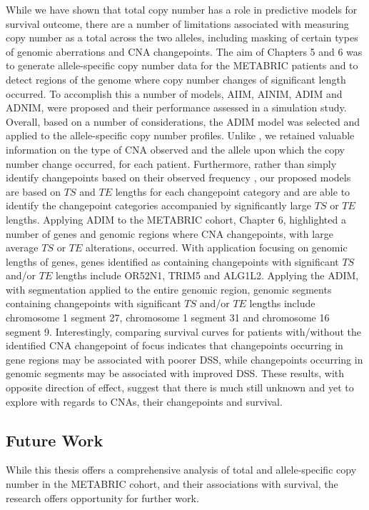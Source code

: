 While we have shown that total copy number has a role in predictive models for survival outcome, there are a number of limitations associated with measuring copy number as a total across the two alleles, including masking of certain types of genomic aberrations and CNA changepoints. The aim of Chapters 5 and 6 was to generate allele-specific copy number data for the METABRIC patients and to detect regions of the genome where copy number changes of significant length occurred. To accomplish this a number of models, AIIM, AINIM, ADIM and ADNIM, were proposed and their performance assessed in a simulation study. Overall, based on a number of considerations, the ADIM model was selected and applied to the allele-specific copy number profiles. Unlike \cite{pmid32242091}, we retained valuable information on the type of CNA observed and the allele upon which the copy number change occurred, for each patient. Furthermore, rather than simply identify changepoints based on their observed frequency \citep{GB}, our proposed models are based on $TS$ and $TE$ lengths for each changepoint category and are able to identify the changepoint categories accompanied by significantly large $TS$ or $TE$ lengths. Applying ADIM to the METABRIC cohort, Chapter 6, highlighted a number of genes and genomic regions where CNA changepoints, with large average $TS$ or $TE$ alterations, occurred. With application focusing on genomic lengths of genes, genes identified as containing changepoints with significant $TS$ and/or $TE$ lengths include OR52N1, TRIM5 and ALG1L2. Applying the ADIM, with segmentation applied to the entire genomic region, genomic segments containing changepoints with significant $TS$ and/or $TE$ lengths include chromosome 1 segment 27, chromosome 1 segment 31 and chromosome 16 segment 9. Interestingly, comparing survival curves for patients with/without the identified CNA changepoint of focus indicates that changepoints occurring in gene regions may be associated with poorer DSS, while changepoints occurring in genomic segments may be associated with improved DSS. These results, with opposite direction of effect, suggest that there is much still unknown and yet to explore with regards to CNAs, their changepoints and survival.

\subsection{Future Work}
While this thesis offers a comprehensive analysis of total and allele-specific copy number in the METABRIC cohort, and their associations with survival, the research offers opportunity for further work.  

